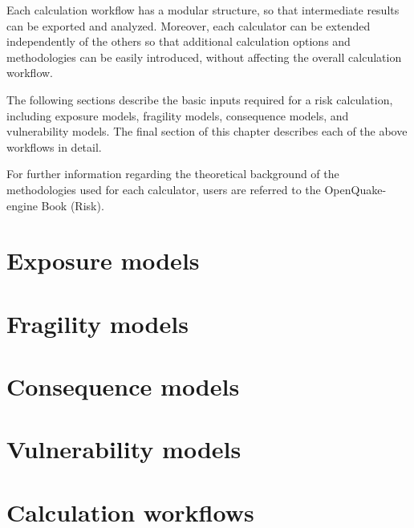 Each calculation workflow has a modular structure, so that intermediate
results can be exported and analyzed. Moreover, each calculator can be
extended independently of the others so that additional calculation options
and methodologies can be easily introduced, without affecting the overall
calculation workflow.

The following sections describe the basic inputs required for a risk
calculation, including exposure models, fragility models, consequence models,
and vulnerability models. The final section of this chapter describes each of
the above workflows in detail.

For further information regarding the theoretical background of the
methodologies used for each calculator, users are referred to the OpenQuake-
engine Book (Risk).


\section{Exposure models}
\label{sec:exposure}


\section{Fragility models}
\label{sec:fragility}


\section{Consequence models}
\label{sec:consequence}


\section{Vulnerability models}
\label{sec:vulnerability}


\section{Calculation workflows}
\label{sec:risk_workflows}
